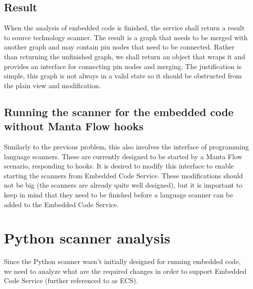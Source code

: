 \subsection{Result}

When the analysis of embedded code is finished, the service shall return a result to source technology scanner. The result is a graph that needs to be merged with another graph and may contain pin nodes that need to be connected. Rather than returning the unfinished graph, we shall return an object that wraps it and provides an interface for connecting pin nodes and merging. The justification is simple, this graph is not always in a valid state so it should be obstructed from the plain view and modification.
\par




\subsection{Running the scanner for the embedded code without Manta Flow hooks}
Similarly to the previous problem, this also involves the interface of programming language scanners. These are currently designed to be started by a Manta Flow scenario, responding to hooks. It is desired to modify this interface to enable starting the scanners from Embedded Code Service. These modifications should not be big (the scanners are already quite well designed), but it is important to keep in mind that they need to be finished before a language scanner can be added to the Embedded Code Service. 






\section{Python scanner analysis}

Since the Python scanner wasn't initially designed for running embedded code, we need to analyze what are the required changes in order to support Embedded Code Service (further referenced to as ECS).

